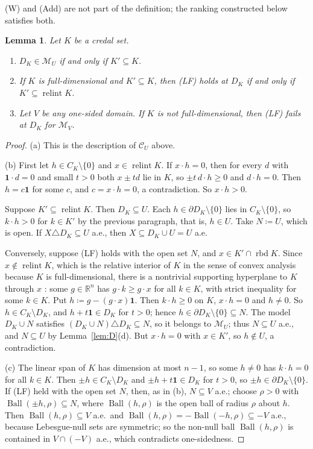 \documentclass[11pt]{article}
\newcommand{\R}{\mathbb{R}}
\newcommand{\one}{\mathbf{1}}
\newcommand{\M}{\mathcal{M}}
\newcommand{\CC}{\mathcal{C}}
\DeclareMathOperator{\relint}{relint}
\DeclareMathOperator{\rbd}{rbd}
\theoremstyle{plain}
\newtheorem{lemma}[theorem]{Lemma}
\theoremstyle{definition}
\theoremstyle{remark}
\begin{document}
(W) and (Add) are not part of the definition; the ranking constructed below satisfies
both.

\begin{lemma}\label{lem:LF}
Let $K$ be a credal set.
\begin{enumerate}[label=(\alph*)]
  \item $D_K\in\M_U$ if and only if $K'\subseteq K$.
  \item If $K$ is full-dimensional and $K'\subseteq K$, then (LF) holds at $D_K$ if and
  only if $K'\subseteq\relint K$.
  \item Let $V$ be any one-sided domain. If $K$ is not full-dimensional, then (LF) fails
  at $D_K$ for $\M_V$.
\end{enumerate}
\end{lemma}

\begin{proof}
(a) This is the description of $\CC_U$ above.

(b) First let $h\in C_K\setminus\{0\}$ and $x\in\relint K$. If $x\cdot h=0$, then for
every $d$ with $\one\cdot d=0$ and small $t>0$ both $x\pm td$ lie in $K$, so $\pm t\,d
\cdot h\ge0$ and $d\cdot h=0$. Then $h=c\one$ for some $c$, and $c=x\cdot h=0$, a
contradiction. So $x\cdot h>0$.

Suppose $K'\subseteq\relint K$. Then $D_K\subseteq U$. Each $h\in\partial D_K\setminus
\{0\}$ lies in $C_K\setminus\{0\}$, so $k\cdot h>0$ for $k\in K'$ by the previous
paragraph, that is, $h\in U$. Take $N\coloneqq U$, which is open. If $X\triangle D_K
\subseteq U$ a.e., then $X\subseteq D_K\cup U=U$ a.e.

Conversely, suppose (LF) holds with the open set $N$, and $x\in K'\cap\rbd K$. Since
$x\notin\relint K$, which is the relative interior of $K$ in the sense of convex analysis
because $K$ is full-dimensional, there is a nontrivial supporting hyperplane to $K$
through $x$ \cite[Thm.~11.6]{Rockafellar}: some $g\in\R^n$ has $g\cdot k\ge g\cdot x$ for
all $k\in K$, with strict inequality for some $k\in K$. Put $h\coloneqq g-(g\cdot x)\one$.
Then $k\cdot h\ge0$ on $K$, $x\cdot h=0$ and $h\ne0$. So $h\in C_K\setminus D_K$, and
$h+t\one\in D_K$ for $t>0$; hence $h\in\partial D_K\setminus\{0\}\subseteq N$. The model
$D_K\cup N$ satisfies $(D_K\cup N)\triangle D_K\subseteq N$, so it belongs to $\M_U$;
thus $N\subseteq U$ a.e., and $N\subseteq U$ by Lemma~\ref{lem:D}(d). But $x\cdot h=0$
with $x\in K'$, so $h\notin U$, a contradiction.

(c) The linear span of $K$ has dimension at most $n-1$, so some $h\ne0$ has $k\cdot h=0$
for all $k\in K$. Then $\pm h\in C_K\setminus D_K$ and $\pm h+t\one\in D_K$ for $t>0$, so
$\pm h\in\partial D_K\setminus\{0\}$. If (LF) held with the open set $N$, then, as in (b),
$N\subseteq V$ a.e.; choose $\rho>0$ with $\operatorname{Ball}(\pm h,\rho)\subseteq N$,
where $\operatorname{Ball}(h,\rho)$ is the open ball of radius $\rho$ about $h$. Then
$\operatorname{Ball}(h,\rho)\subseteq V$ a.e.\ and $\operatorname{Ball}(h,\rho)=
-\operatorname{Ball}(-h,\rho)\subseteq-V$ a.e., because Lebesgue-null sets are symmetric;
so the non-null ball $\operatorname{Ball}(h,\rho)$ is contained
in $V\cap(-V)$ a.e., which contradicts one-sidedness.
\end{proof}
\end{document}
